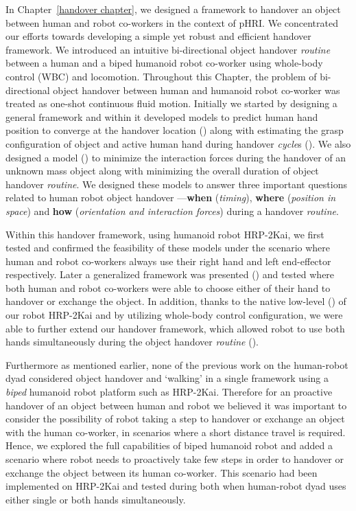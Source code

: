 In Chapter~\ref{handover chapter}, we designed a framework to handover an object between human and robot co-workers in the context of pHRI. We concentrated our efforts towards developing a simple yet robust and efficient handover framework. We introduced an intuitive bi-directional object handover \textit{routine} between a human and a biped humanoid robot co-worker using whole-body control (WBC) and locomotion. Throughout this Chapter, the problem of bi-directional object handover between human and humanoid robot co-worker was treated as one-shot continuous fluid motion. Initially we started by designing a general framework and within it developed models to predict human hand position to converge at the handover location () along with estimating the grasp configuration of object and active human hand during handover \textit{cycle}s (). We also designed a model () to minimize the interaction forces during the handover of an unknown mass object along with minimizing the overall duration of object handover \textit{routine}. We designed these models to answer three important questions related to human robot object handover ---\textbf{when} (\textit{timing}), \textbf{where} (\textit{position in space}) and \textbf{how} (\textit{orientation and interaction forces}) during a handover \textit{routine}. 

Within this handover framework, using humanoid robot HRP-2Kai, we first tested and confirmed the feasibility of these models under the scenario where human and robot co-workers always use their right hand and left end-effector respectively. Later a generalized framework was presented () and tested where both human and robot co-workers were able to choose either of their hand to handover or exchange the object. In addition, thanks to the native low-level () of our robot HRP-2Kai and by utilizing whole-body control configuration, we were able to further extend our handover framework, which allowed robot to use both hands simultaneously during the object handover \textit{routine} (). 

Furthermore as mentioned earlier, none of the previous work on the human-robot dyad considered object handover and `walking' in a single framework using a \textit{biped} humanoid robot platform such as HRP-2Kai. Therefore for an proactive handover of an object between human and robot we believed it was important to consider the possibility of robot taking a step to handover or exchange an object with the human co-worker, in scenarios where a short distance travel is required. Hence, we explored the full capabilities of biped humanoid robot and added a scenario where robot needs to proactively take few steps in order to handover or exchange the object between its human co-worker. This scenario had been implemented on HRP-2Kai and tested during both when human-robot dyad uses either single or both hands simultaneously. 


